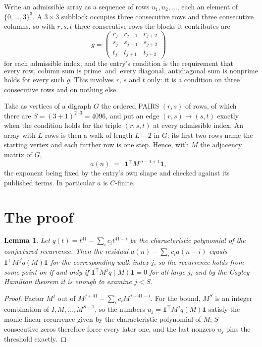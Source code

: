 \documentclass[11pt,a4paper]{article}
\theoremstyle{plain}
\newtheorem{lemma}[theorem]{Lemma}
\theoremstyle{definition}
\begin{document}
Write an admissible array as a sequence of rows $u_1,u_2,\dots$, each an element of
$\{0,\dots,3\}^{3}$. A $3\times3$ subblock occupies three consecutive rows and
three consecutive columns, so with $r,s,t$ three consecutive rows the blocks it
contributes are
\[
g=\begin{pmatrix}r_j&r_{j+1}&r_{j+2}\\ s_j&s_{j+1}&s_{j+2}\\ t_j&t_{j+1}&t_{j+2}\end{pmatrix}
\]
for each admissible index, and the entry's condition is the requirement that
\[
\text{every row, column sum is prime}\ \text{ and }\ \text{every diagonal, antidiagonal sum is nonprime}
\]
holds for every such $g$. This involves $r$, $s$ and $t$ only: it is a condition on
three consecutive rows and on nothing else.

Take as vertices of a digraph $G$ the ordered PAIRS $(r,s)$ of rows, of which there are
$S=(3+1)^{2\cdot3}=4096$, and put an edge $(r,s)\to(s,t)$ exactly when the condition
holds for the triple $(r,s,t)$ at every admissible index. An array with $L$ rows is then a
walk of length $L-2$ in $G$: its first two rows name the starting vertex and each further
row is one step. Hence, with $M$ the adjacency matrix of $G$,
\[
a(n)\;=\;\,\mathbf{1}^{\!\top}M^{\,n-1+1}\mathbf{1},
\]
the exponent being fixed by the entry's own shape and checked against its published terms.
In particular $a$ is $C$-finite.

\section{The proof}

\begin{lemma}\label{lem:crit}
Let $q(t)=t^{41}-\sum_i c_it^{41-i}$ be the characteristic polynomial of the
conjectured recurrence. Then the residual $a(n)-\sum_ic_ia(n-i)$ equals
$\mathbf{1}^{\!\top}M^{\,j}q(M)\mathbf{1}$ for the corresponding walk index
$j$, so the recurrence holds from some point on if and only if
$\mathbf{1}^{\!\top}M^{j}q(M)\mathbf{1}=0$ for all large $j$; and by the
Cayley--Hamilton theorem it is enough to examine $j<S$.
\end{lemma}

\begin{proof}
Factor $M^{j}$ out of $M^{j+41}-\sum_ic_iM^{j+41-i}$. For the bound, $M^{S}$
is an integer combination of $I,M,\dots,M^{S-1}$, so the numbers
$u_j=\mathbf{1}^{\!\top}M^{j}q(M)\mathbf{1}$ satisfy the monic linear recurrence given by
the characteristic polynomial of $M$; $S$ consecutive zeros therefore force every later one,
and the last nonzero $u_j$ pins the threshold exactly.
\end{proof}
\end{document}
